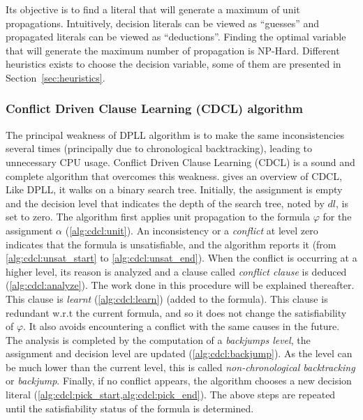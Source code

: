 Its objective is to find a literal that will generate a maximum of unit propagations.
Intuitively, decision literals can be viewed as “guesses” and propagated literals can be viewed as “deductions”. 
Finding the optimal variable that will generate the maximum number of propagation is NP-Hard\cite{biere2009handbook}.
Different heuristics exists to choose the decision variable, some of them are presented in Section~\ref{sec:heuristics}.
%
%
\subsubsection{Conflict Driven Clause Learning (CDCL) algorithm}\label{sec:cdcl}
The principal weakness of DPLL algorithm is to make the same inconsistencies several times
(principally due to chronological backtracking), leading to  unnecessary CPU usage.
Conflict Driven Clause Learning (CDCL) \cite{marques1999grasp} is a sound and complete algorithm
that overcomes this weakness.
 gives an overview of CDCL, Like DPLL,  it walks on a binary search tree.
Initially, the  assignment is empty and the decision level that 
indicates the depth of the search tree, noted by $dl$, is set to zero.
The algorithm first applies unit propagation to the formula $\varphi$ for the  assignment $\alpha$ (\cref{alg:cdcl:unit}).
An inconsistency or a \emph{conflict} at level zero indicates that the formula is unsatisfiable, and the algorithm
reports it (from \cref{alg:cdcl:unsat_start} to \cref{alg:cdcl:unsat_end}). When the conflict is occurring at a higher level,
 its reason is analyzed and a clause called \emph{conflict clause} is deduced (\cref{alg:cdcl:analyze}).
The work done in this procedure will be explained thereafter.
This clause is \emph{learnt} (\cref{alg:cdcl:learn}) (added to the formula). This clause is redundant w.r.t the current
formula, and so it does not change the satisfiability of $\varphi$. It also avoids encountering a conflict with the same
causes in the future. %
The analysis is completed by the computation of a \emph{backjumps level}, the assignment and decision level are updated (\cref{alg:cdcl:backjump}).
 As the level can be much lower than the current level, this is called \emph{non-chronological backtracking} or \textit{backjump}.
Finally, if no conflict appears, the algorithm chooses a new decision literal 
(\cref{alg:cdcl:pick_start,alg:cdcl:pick_end}).
The above steps are repeated until the satisfiability status of the formula is determined.

